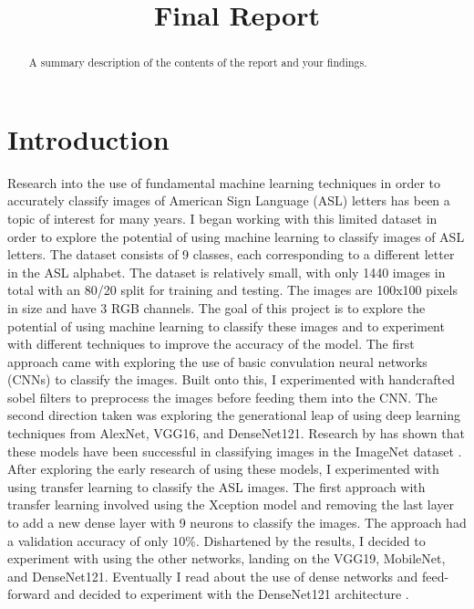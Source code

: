 \documentclass[conference]{IEEEtran}
\begin{document}
\title{Final Report\\}

\author{
}

\maketitle

\begin{abstract}
A summary description of the contents of the report and your findings.
\end{abstract}

\section{Introduction}

Research into the use of fundamental machine learning techniques in order to accurately classify images of American Sign Language (ASL) letters has been a topic of interest for many years. I began working with this limited dataset in order to explore the potential of using machine learning to classify images of ASL letters. The dataset consists of 9 classes, each corresponding to a different letter in the ASL alphabet. The dataset is relatively small, with only 1440 images in total with an 80/20 split for training and testing. The images are 100x100 pixels in size and have 3 RGB channels. The goal of this project is to explore the potential of using machine learning to classify these images and to experiment with different techniques to improve the accuracy of the model. The first approach came with exploring the use of basic convulation neural networks (CNNs) to classify the images. Built onto this, I experimented with handcrafted sobel filters to preprocess the images before feeding them into the CNN. The second direction taken was exploring the generational leap of using deep learning techniques from AlexNet, VGG16, and DenseNet121. Research by has shown that these models have been successful in classifying images in the ImageNet dataset \cite{NIPS2012_c399862d}. After exploring the early research of using these models, I experimented with using transfer learning to classify the ASL images. The first approach with transfer learning involved using the Xception model and removing the last layer to add a new dense layer with 9 neurons to classify the images. The approach had a validation accuracy of only $10\%$. Dishartened by the results, I decided to experiment with using the other networks, landing on the VGG19, MobileNet, and DenseNet121. Eventually I read about the use of dense networks and feed-forward and decided to experiment with the DenseNet121 architecture \cite{DBLP:journals/corr/HuangLW16a}.
\end{document}
